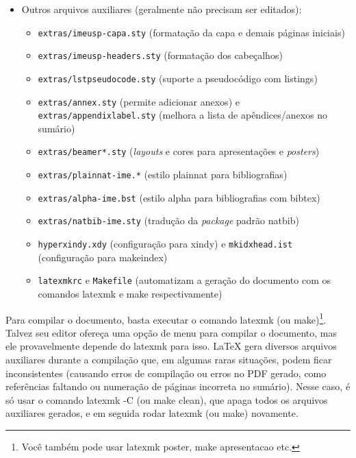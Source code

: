 \begin{itemize}
  \item Outros arquivos auxiliares (geralmente não precisam ser editados):
  \begin{itemize}
    \item \texttt{extras/imeusp-capa.sty} (formatação da capa e demais páginas iniciais)
    \item \texttt{extras/imeusp-headers.sty} (formatação dos cabeçalhos)
    \item \texttt{extras/lstpseudocode.sty} (suporte a pseudocódigo com \textsf{listings})
    \item \texttt{extras/annex.sty} (permite adicionar anexos) e
          \texttt{extras/appendixlabel.sty} (melhora a lista de
          apêndices/anexos no sumário)
    \item \texttt{extras/beamer*.sty} (\textit{layouts} e cores para
          apresentações e \textit{posters})
    \item \texttt{extras/plainnat-ime.*} (estilo plainnat para bibliografias)
    \item \texttt{extras/alpha-ime.bst} (estilo alpha para bibliografias com
          bibtex)
    \item \texttt{extras/natbib-ime.sty} (tradução da \textit{package}
          padrão natbib)
    \item \texttt{hyperxindy.xdy} (configuração para xindy) e
          \texttt{mkidxhead.ist} (configuração para makeindex)
    \item \texttt{latexmkrc} e \texttt{Makefile} (automatizam a geração do
          documento com os comandos \textsf{latexmk} e \textsf{make} respectivamente)
  \end{itemize}
\end{itemize}

Para compilar o documento, basta executar o comando \textsf{latexmk} (ou
\textsf{make})\footnote{Você também pode usar \textsf{latexmk poster},
\textsf{make apresentacao} etc.}. Talvez seu editor ofereça uma
opção de menu para compilar o documento, mas ele provavelmente depende do
\textsf{latexmk} para isso. \LaTeX{} gera diversos arquivos auxiliares
durante a compilação que, em algumas raras situações, podem ficar
inconsistentes (causando erros de compilação ou erros no PDF gerado, como
referências faltando ou numeração de páginas incorreta no sumário). Nesse
caso, é só usar o comando \textsf{latexmk -C} (ou \textsf{make clean}),
que apaga todos os arquivos auxiliares gerados, e em seguida rodar
\textsf{latexmk} (ou \textsf{make}) novamente.

